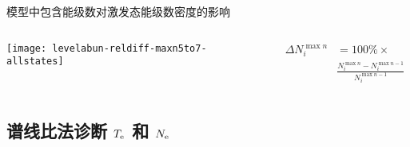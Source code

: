 \begin{CJK*}{UTF8}{kai}
\begin{frame}{模型中包含能级数对激发态能级数密度的影响}%
		\begin{columns}[T]
	\vspace{-0.7cm}
	\begin{center}
		\texttt{[image: levelabun-reldiff-maxn5to7-allstates]}
	\end{center}
	
	\begin{align*}
	   \Delta N_i^{\max n} & = 100\% \times \\
    	 & \frac{N_i^{\max n}-N_i^{\max n-1}}{N_i^{\max n-1}}
	\end{align*}
    \vspace{1em}
	\end{columns}
\end{frame}

%

\subsection{谱线比法诊断 $T_{\rm e}$ 和 $N_{\rm e}$}


\end{CJK*}
